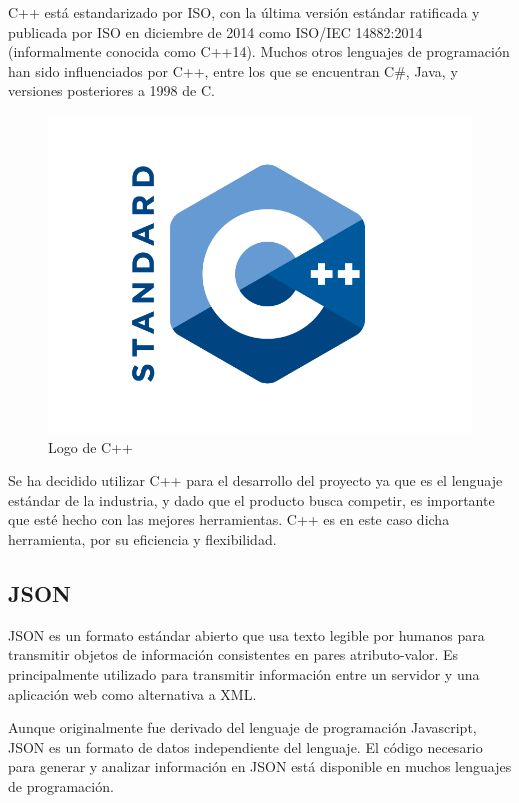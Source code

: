		C++ está estandarizado por ISO, con la última versión estándar ratificada y publicada por ISO en diciembre de 2014 como ISO/IEC 14882:2014 (informalmente conocida como C++14). Muchos otros lenguajes de programación han sido influenciados por C++, entre los que se encuentran C#, Java, y versiones posteriores a 1998 de C.

		\begin{figure}[!htp]
			 \centering
			 \includegraphics{fig/cpp}
			 \caption{Logo de C++}
			 \label{fig:cpp}
		\end{figure}

		Se ha decidido utilizar C++ para el desarrollo del proyecto ya que es el lenguaje estándar de la industria, y dado que el producto busca competir, es importante que esté hecho con las mejores herramientas. C++ es en este caso dicha herramienta, por su eficiencia y flexibilidad.

	\subsection{JSON}

		JSON es un formato estándar abierto que usa texto legible por humanos para transmitir objetos de información consistentes en pares atributo-valor. Es principalmente utilizado para transmitir información entre un servidor y una aplicación web como alternativa a XML.

		Aunque originalmente fue derivado del lenguaje de programación Javascript, JSON es un formato de datos independiente del lenguaje. El código necesario para generar y analizar información en JSON está disponible en muchos lenguajes de programación.

